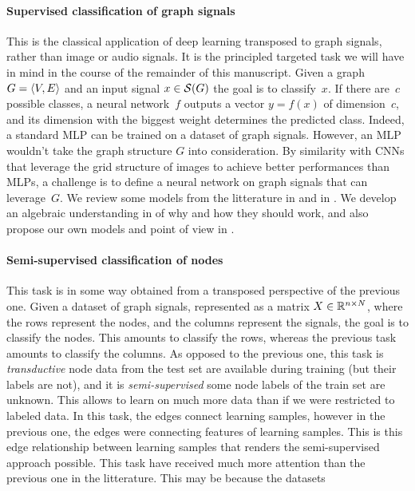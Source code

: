 \paragraph{Supervised classification of graph signals}
This is the classical application of deep learning transposed to graph signals, rather than image or audio signals. It is the principled targeted task we will have in mind in the course of the remainder of this manuscript. Given a graph $G = \langle V, E \rangle$ and an input signal $x \in \mathcal{S}(G)$ the goal is to classify~$x$. If there are~$c$ possible classes, a neural network~$f$ outputs a vector $y = f(x)$ of dimension~$c$, and its dimension with the biggest weight determines the predicted class. Indeed, a standard MLP can be trained on a dataset of graph signals. However, an MLP wouldn't take the graph structure $G$ into consideration. By similarity with CNNs that leverage the grid structure of images to achieve better performances than MLPs, a challenge is to define a neural network on graph signals that can leverage~$G$. We review some models from the litterature in  and in . We develop an algebraic understanding in  of why and how they should work, and also propose our own models and point of view in .

\paragraph{Semi-supervised classification of nodes}
This task is in some way obtained from a transposed perspective of the previous one. Given a dataset of graph signals, represented as a matrix $X \in \mathbb{R}^{n \times N}$, where the rows represent the nodes, and the columns represent the signals, the goal is to classify the nodes. This amounts to classify the rows, whereas the previous task amounts to classify the columns. As opposed to the previous one, this task is \emph{transductive} \ie node data from the test set are available during training (but their labels are not), and it is \emph{semi-supervised} \ie some node labels of the train set are unknown. This allows to learn on much more data than if we were restricted to labeled data. In this task, the edges connect learning samples, however in the previous one, the edges were connecting features of learning samples. This is this edge relationship between learning samples that renders the semi-supervised approach possible. This task have received much more attention than the previous one in the litterature. This may be because the datasets

